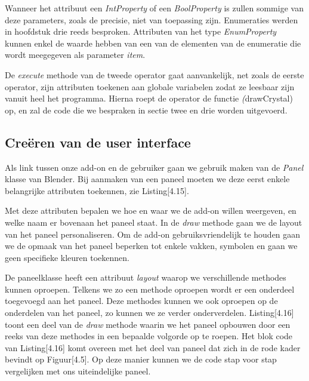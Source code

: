 Wanneer het attribuut een \textit{IntProperty} of een \textit{BoolProperty} is zullen sommige van deze parameters, zoals de precisie, niet van toepassing zijn. Enumeraties werden in hoofdstuk drie reeds besproken. Attributen van het type \textit{EnumProperty} kunnen enkel de waarde hebben van een van de elementen van de enumeratie die wordt meegegeven als parameter \textit{item}.
\par
De \textit{execute} methode van de tweede operator gaat aanvankelijk, net zoals de eerste operator, zijn attributen toekenen aan globale variabelen zodat ze leesbaar zijn vanuit heel het programma. Hierna roept de operator de functie \textit(drawCrystal) op, en zal de code die we bespraken in sectie twee en drie  worden uitgevoerd.  

\subsection{Creëren van de user interface}
Als link tussen onze add-on en de gebruiker gaan we gebruik maken van de \textit{Panel} klasse van Blender. Bij aanmaken van een paneel moeten we deze eerst enkele belangrijke attributen toekennen, zie Listing[4.15].
 


Met deze attributen bepalen we hoe en waar we de add-on willen weergeven, en welke naam er bovenaan het paneel staat. In de \textit{draw} methode gaan we de layout van het paneel personaliseren. Om de add-on gebruiksvriendelijk te houden gaan we de opmaak van het paneel beperken tot enkele vakken, symbolen en gaan we geen specifieke kleuren toekennen.
\par
De paneelklasse heeft een attribuut \textit{layout} waarop we verschillende methodes kunnen oproepen. Telkens we zo een methode oproepen wordt er een onderdeel toegevoegd aan het paneel. Deze methodes kunnen we ook oproepen op de onderdelen van het paneel, zo kunnen we ze verder onderverdelen. Listing[4.16] toont een deel van de \textit{draw} methode waarin we het paneel opbouwen door een reeks van deze methodes in een bepaalde volgorde op te roepen. Het blok code van Listing[4.16] komt overeen met het deel van paneel dat zich in de rode kader bevindt op Figuur[4.5]. Op deze manier kunnen we de code stap voor stap vergelijken met ons uiteindelijke paneel.   



